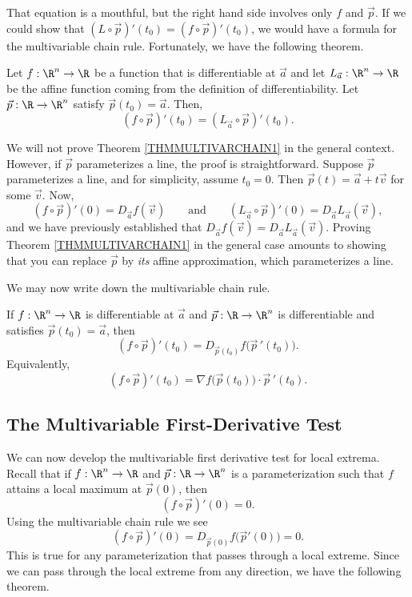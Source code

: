 That equation is a mouthful, but the right hand side involves only $f$ and $\vec p$.
If we could show that $(L\circ \vec p)'(t_0)=(f\circ \vec p)'(t_0)$, we would
have a formula for the multivariable chain rule.  Fortunately, we have the following
theorem.

\begin{theorem}
	\label{THMMULTIVARCHAIN1}
	Let $f:\R^n\to\R$ be a function that is differentiable at $\vec a$ and
	let $L_{\vec a}:\R^n\to\R$ be the affine function coming from
	the definition of differentiability.
	Let $\vec p:\R\to\R^n$ satisfy $\vec p(t_0)=\vec a$.  Then,
	\[
		(f\circ \vec p)'(t_0)=(L_{\vec a}\circ \vec p)'(t_0).
	\]
\end{theorem}

We will not prove Theorem \ref{THMMULTIVARCHAIN1} in the general context.
However, if $\vec p$ parameterizes a line, the proof is straightforward. 
Suppose $\vec p$ parameterizes a line, and for simplicity, assume 
$t_0=0$.  Then $\vec p(t) = \vec a+t\vec v$ for some $\vec v$.  Now,
\[
	(f\circ \vec p)'(0) = D_{\vec a}f(\vec v)\qquad\text{and}
	\qquad(L_{\vec a}\circ \vec p)'(0) = D_{\vec a}L_{\vec a}(\vec v),
\]
and we have previously established that $D_{\vec a}f(\vec v)=D_{\vec a}L_{\vec a}(\vec v)$.
Proving Theorem \ref{THMMULTIVARCHAIN1} in the general case amounts to
showing that you can replace $\vec p$ by \emph{its} affine approximation,
which parameterizes a line.

We may now write down the multivariable chain rule.
\begin{theorem}
	If $f:\R^n\to\R$ is differentiable at $\vec a$
	and $\vec p:\R\to\R^n$ is differentiable and
	satisfies $\vec p(t_0)=\vec a$, then
	\[
		(f\circ\vec p)'(t_0)=
		D_{\vec p(t_0)}f\big(\vec p\,'(t_0)\big).
	\]
	Equivalently,
	\[
		(f\circ\vec p)'(t_0)=
		\nabla f\big(\vec p(t_0)\big)\cdot\vec p\,'(t_0).
	\]
\end{theorem}

\subsection{The Multivariable First-Derivative Test}

We can now develop the multivariable first derivative test for local extrema.
Recall that if $f:\R^n\to\R$ and $\vec p:\R\to\R^n$ is a parameterization such
that $f$ attains a local maximum at $\vec p(0)$, then
\[
	(f\circ \vec p)'(0)=0.
\]
Using the multivariable chain rule we see
\[
	(f\circ \vec p)'(0) = D_{\vec p(0)} f\big(\vec p'(0)\big) = 0.
\]
This is true for any parameterization that passes through a local extreme.
Since we can pass through the local extreme from any direction, we have the following
theorem.


